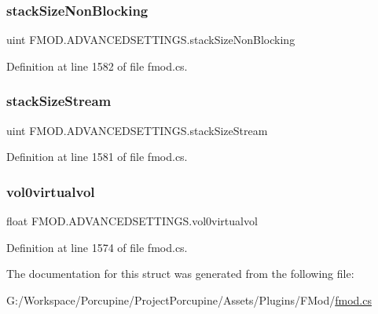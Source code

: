 \subsubsection{\texorpdfstring{stack\+Size\+Non\+Blocking}{stackSizeNonBlocking}}
{\footnotesize\ttfamily uint F\+M\+O\+D.\+A\+D\+V\+A\+N\+C\+E\+D\+S\+E\+T\+T\+I\+N\+G\+S.\+stack\+Size\+Non\+Blocking}



Definition at line 1582 of file fmod.\+cs.

\mbox{\label{struct_f_m_o_d_1_1_a_d_v_a_n_c_e_d_s_e_t_t_i_n_g_s_a2fdae986f0011dd72930419dd276910c}} 
\subsubsection{\texorpdfstring{stack\+Size\+Stream}{stackSizeStream}}
{\footnotesize\ttfamily uint F\+M\+O\+D.\+A\+D\+V\+A\+N\+C\+E\+D\+S\+E\+T\+T\+I\+N\+G\+S.\+stack\+Size\+Stream}



Definition at line 1581 of file fmod.\+cs.

\mbox{\label{struct_f_m_o_d_1_1_a_d_v_a_n_c_e_d_s_e_t_t_i_n_g_s_ace01c3fa9a58fedc999889e1f961000e}} 
\subsubsection{\texorpdfstring{vol0virtualvol}{vol0virtualvol}}
{\footnotesize\ttfamily float F\+M\+O\+D.\+A\+D\+V\+A\+N\+C\+E\+D\+S\+E\+T\+T\+I\+N\+G\+S.\+vol0virtualvol}



Definition at line 1574 of file fmod.\+cs.



The documentation for this struct was generated from the following file\+:\begin{DoxyCompactItemize}
\item 
G\+:/\+Workspace/\+Porcupine/\+Project\+Porcupine/\+Assets/\+Plugins/\+F\+Mod/\hyperlink{fmod_8cs}{fmod.\+cs}\end{DoxyCompactItemize}
